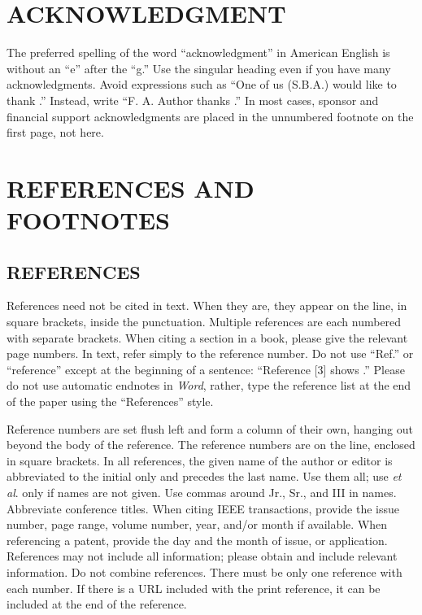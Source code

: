\documentclass{IEEEoj}
\begin{document}
\section*{ACKNOWLEDGMENT}
The preferred spelling of the word ``acknowledgment'' in American English is 
without an ``e'' after the ``g.'' Use the singular heading even if you have 
many acknowledgments. Avoid expressions such as ``One of us (S.B.A.) would 
like to thank \textellipsis .'' Instead, write ``F. A. Author thanks \textellipsis .'' In most 
cases, sponsor and financial support acknowledgments are placed in the 
unnumbered footnote on the first page, not here.

\section*{REFERENCES AND FOOTNOTES}
\subsection{REFERENCES}
References need not be cited in text. When they are, they appear on the 
line, in square brackets, inside the punctuation. Multiple references are 
each numbered with separate brackets. When citing a section in a book, 
please give the relevant page numbers. In text, refer simply to the 
reference number. Do not use ``Ref.'' or ``reference'' except at the 
beginning of a sentence: ``Reference [3] shows \textellipsis .'' Please do not use 
automatic endnotes in \textit{Word}, rather, type the reference list at the end of the 
paper using the ``References'' style.

Reference numbers are set flush left and form a column of their own, hanging 
out beyond the body of the reference. The reference numbers are on the line, 
enclosed in square brackets. In all references, the given name of the author 
or editor is abbreviated to the initial only and precedes the last name. Use 
them all; use \textit{et al}. only if names are not given. Use commas around Jr., Sr., and 
III in names. Abbreviate conference titles. When citing IEEE transactions, 
provide the issue number, page range, volume number, year, and/or month if 
available. When referencing a patent, provide the day and the month of 
issue, or application. References may not include all information; please 
obtain and include relevant information. Do not combine references. There 
must be only one reference with each number. If there is a URL included with 
the print reference, it can be included at the end of the reference. 
\end{document}
